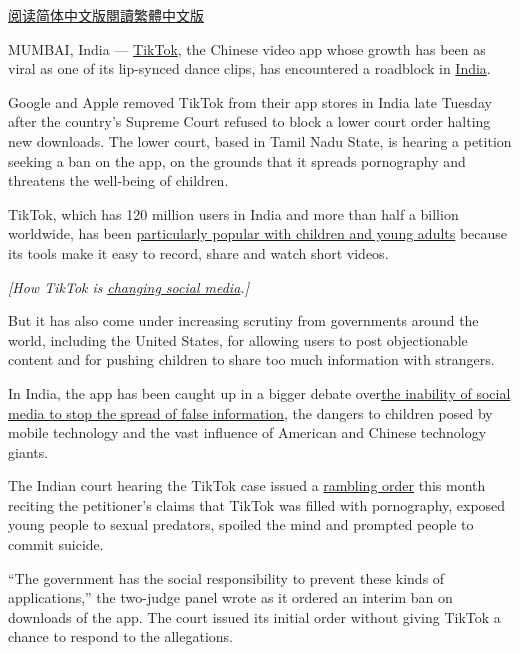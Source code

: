 \href{https://cn.nytimes.com/business/20190418/india-tiktok-children-privacy/}{阅读简体中文版}\href{https://cn.nytimes.com/business/20190418/india-tiktok-children-privacy/zh-hant/}{閱讀繁體中文版}

MUMBAI, India ---
\href{https://www.nytimes.com/2020/06/30/technology/india-china-tiktok.html}{TikTok},
the Chinese video app whose growth has been as viral as one of its
lip-synced dance clips, has encountered a roadblock in
\href{https://www.nytimes.com/2020/06/30/technology/india-china-tiktok.html}{India}.

Google and Apple removed TikTok from their app stores in India late
Tuesday after the country's Supreme Court refused to block a lower court
order halting new downloads. The lower court, based in Tamil Nadu State,
is hearing a petition seeking a ban on the app, on the grounds that it
spreads pornography and threatens the well-being of children.

TikTok, which has 120 million users in India and more than half a
billion worldwide, has been
\href{https://www.nytimes.com/2019/03/10/style/what-is-tik-tok.html}{particularly
popular with children and young adults} because its tools make it easy
to record, share and watch short videos.

\emph{{[}How TikTok is}
\href{https://www.nytimes.com/2019/03/10/style/what-is-tik-tok.html}{\emph{changing
social media}}\emph{.{]}}

But it has also come under increasing scrutiny from governments around
the world, including the United States, for allowing users to post
objectionable content and for pushing children to share too much
information with strangers.

In India, the app has been caught up in a bigger debate
over\href{https://www.nytimes.com/2019/04/01/technology/india-elections-facebook.html}{the
inability of social media to stop the spread of false information}, the
dangers to children posed by mobile technology and the vast influence of
American and Chinese technology giants.

The Indian court hearing the TikTok case issued a
\href{https://www.livelaw.in/top-stories/tiktok-mobile-application-download-prohibited-144046}{rambling
order} this month reciting the petitioner's claims that TikTok was
filled with pornography, exposed young people to sexual predators,
spoiled the mind and prompted people to commit suicide.

``The government has the social responsibility to prevent these kinds of
applications,'' the two-judge panel wrote as it ordered an interim ban
on downloads of the app. The court issued its initial order without
giving TikTok a chance to respond to the allegations.

